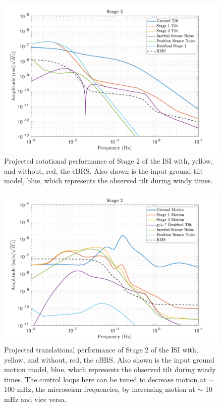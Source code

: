 \documentclass [12pt, proquest]{uwthesis}[2019]
\begin{document}
\begin{figure}%
\begin{center}
\includegraphics[width=\textwidth]{cBRS_Model_ST2RX.pdf}
\caption{Projected rotational performance of Stage 2 of the ISI with, yellow, and without, red, the cBRS. Also shown is the input ground tilt model, blue, which represents the observed tilt during windy times.}
\label{cBRS2R}
\end{center}
\end{figure}

\begin{figure}%
\begin{center}
\includegraphics[width=\textwidth]{cBRS_Model_ST2X.pdf}
\caption{Projected translational performance of Stage 2 of the ISI with, yellow, and without, red, the cBRS. Also shown is the input ground motion model, blue, which represents the observed tilt during windy times. The control loops here can be tuned to decrease motion at $\sim$ 100 mHz, the microseism frequencies, by increasing motion at $\sim$ 10 mHz and vice versa.}
\label{cBRS2X}
\end{center}
\end{figure}
\end{document}

